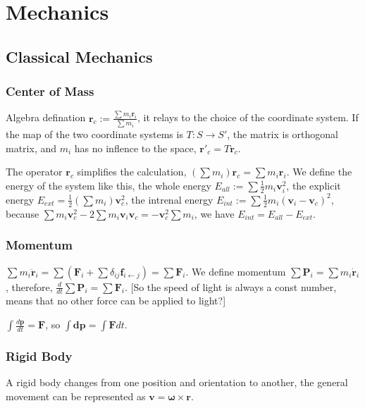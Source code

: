 

\chapter{Mechanics}

\section{Classical Mechanics}


\subsection{Center of Mass}

Algebra defination $\boldsymbol r_c := \frac{\sum m_i \boldsymbol r_i}{\sum m_i} $, it relays to the choice of the coordinate system. If the map of the two coordinate systems is $T: S \rightarrow S'$, the matrix is orthogonal matrix, and $m_i$ has no inflence to the space, $\boldsymbol r'_c = T\boldsymbol r_c$.

The operator $\boldsymbol r_c $ simplifies the calculation, $(\sum m_i)\boldsymbol r_c = \sum m_i \boldsymbol r_i$.
We define the energy of the system like this, the whole energy $E_{all} := \sum \frac{1}{2} m_i \boldsymbol {v}_i^2$, the explicit energy $E_{ext} = \frac{1}{2} (\sum  m_i) \boldsymbol {v}_c^2$, the intrenal energy $E_{int} := \sum \frac{1}{2} m_i (\boldsymbol {v}_i- \boldsymbol {v}_c)^2$, because $\sum m_i \boldsymbol{v}_c^2-2\sum m_i \boldsymbol {v}_i \boldsymbol{v}_c = -\boldsymbol{v}_c^2 \sum m_i$, we have $E_{int} = E_{all} - E_{ext}$.

\subsection{Momentum}

$\sum m_i \boldsymbol {\ddot{r}}_i= \sum ({\boldsymbol F}_i + \sum \delta_{ij}\boldsymbol{f}_{i \leftarrow j})  = \sum \boldsymbol F_i $. We define momentum $\sum \boldsymbol{P}_i  =  \sum m_i \boldsymbol {\dot{r}}_i$, therefore, $\frac{d}{dt} \sum \boldsymbol{P}_i  = \sum {\boldsymbol F}_i$. [So the speed of light is always a const number, means that no other force can be applied to light?]

$\int \frac{d \boldsymbol{p}}{dt} = \boldsymbol{F}$, so $\int \boldsymbol{dp} = \int \boldsymbol F dt$.

\subsection{Rigid Body}
A rigid body changes from one position and orientation to another, the general movement can be represented as $\boldsymbol{v} = \boldsymbol \omega  \times \boldsymbol{r} $. 



